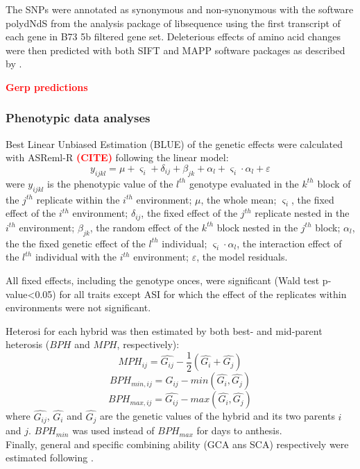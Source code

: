 \documentclass[10pt]{article}
\newcommand{\sme}[1]{\textcolor{red}{\bf #1}}
\begin{document}
The SNPs were annotated as synonymous and non-synonymous with the software polydNdS from the analysis package of libsequence  \citep{Thornton2003} using the first transcript of each gene in B73 5b filtered gene set. Deleterious effects of amino acid changes were then predicted with both SIFT \citep{Ng2003, Ng2006} and MAPP \citep{Stone2005} software packages as described by \citet{mezmouk2014}.

\sme{Gerp predictions}


\subsubsection*{Phenotypic data analyses}

Best Linear Unbiased Estimation (BLUE) of the genetic effects were calculated with ASReml-R \sme{(CITE)} following the linear model: 
%
\[y_{ijkl} = \mu + \varsigma_{i} + \delta_{ij} + \beta_{jk} + \alpha_{l} +  \varsigma_{i} \cdot \alpha_{l} + \varepsilon\]
%
were 
$y_{ijkl}$ is the phenotypic value of the $l^{th}$ genotype evaluated in the $k^{th}$ block of the $j^{th}$ replicate within the $i^{th}$ environment; 
$\mu$, the whole mean; 
$\varsigma_{i}$, the fixed effect of the $i^{th}$ environment;
$\delta_{ij}$, the fixed effect of the $j^{th}$ replicate nested in the $i^{th}$ environment; 
$\beta_{jk}$, the random effect of the $k^{th}$ block nested in the $j^{th}$ block; 
$\alpha_{l}$, the the fixed genetic effect  of the $l^{th}$ individual; 
$\varsigma_{i} \cdot \alpha_{l}$, the interaction effect of the $l^{th}$ individual with the $i^{th}$ environment; 
$\varepsilon$, the model residuals.

All fixed effects, including the genotype onces, were significant (Wald test p-value<0.05) for all traits except ASI for which the effect of the replicates within environments were not significant.

Heterosi for each hybrid was then estimated by both best- and mid-parent heterosis ($BPH$ and $MPH$, respectively):
%
\[ MPH_{ij}=\hat{G_{ij}}-\frac{1}{2}(\hat{G_{i}}+\hat{G_{j}}) \]
\[ BPH_{min,ij}=\hat{G_{ij}}-min(\hat{G_{i}} ,\hat{G_{j}}) \] 
\[ BPH_{max,ij}=\hat{G_{ij}}-max(\hat{G_{i}} ,\hat{G_{j}}) \]
%
where $\hat{G_{ij}}$, $\hat{G_{i}}$ and $\hat{G_{j}}$ are the genetic values of the hybrid and its two parents $i$ and $j$. $BPH_{min}$ was used instead of $BPH_{max}$ for days to anthesis.\\

Finally, general and specific combining ability (GCA ans SCA) respectively were estimated following \citet{Falconer1996}.
\end{document}
